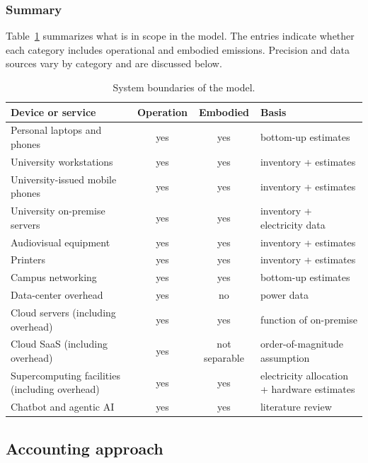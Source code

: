 \documentclass[11pt]{article}
\begin{document}
\subsubsection*{Summary}

Table~\ref{tab:scopes} summarizes what is in scope in the model. The entries
indicate whether each category includes operational and embodied emissions.
Precision and data sources vary by category and are discussed below.

\begin{table}[htbp]
\centering
\small
\setlength{\tabcolsep}{4pt}
\begin{tabular}{|l|c|c|l|}
    \hline
    \textbf{Device or service} & \textbf{Operation} & \textbf{Embodied} & \textbf{Basis} \\ \hline
    Personal laptops and phones & yes & yes & bottom-up estimates \\
    University workstations & yes & yes & inventory + estimates \\
    University-issued mobile phones & yes & yes & inventory + estimates \\
    University on-premise servers & yes & yes & inventory + electricity data \\
    Audiovisual equipment & yes & yes & inventory + estimates \\
    Printers & yes & yes & inventory + estimates \\
    Campus networking & yes & yes & bottom-up estimates \\
    Data-center overhead & yes & no & power data \\
    Cloud servers (including overhead) & yes & yes & function of on-premise \\
    Cloud SaaS (including overhead) & yes & not separable & order-of-magnitude assumption \\
    Supercomputing facilities (including overhead) & yes & yes & electricity allocation + hardware estimates \\
    Chatbot and agentic AI & yes & yes & literature review \\ \hline
\end{tabular}
\caption{System boundaries of the model.}
\label{tab:scopes}
\end{table}

\subsection{Accounting approach}
\end{document}
